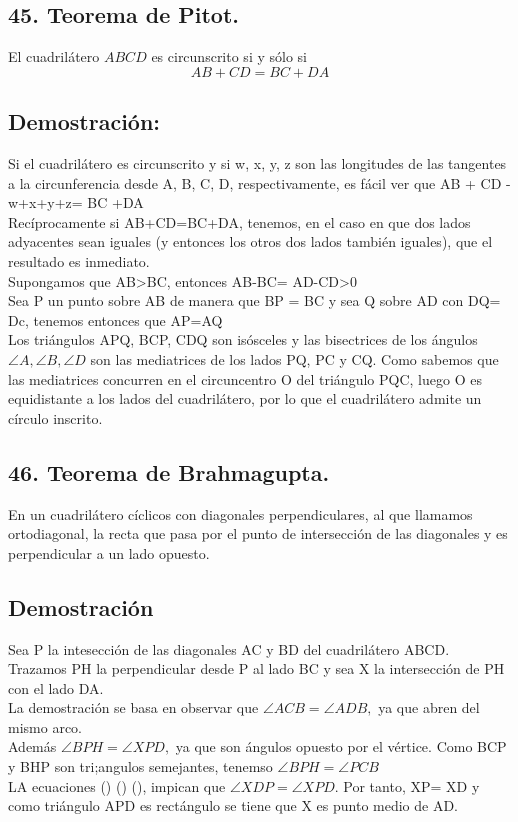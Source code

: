 \documentclass[12pt,a4paper]{article}
\begin{document}
\subsection*{45. Teorema de Pitot.}
El cuadrilátero $ABCD$ es circunscrito si y sólo si $$AB + CD = BC +DA$$
\subsection*{Demostración:}
Si el cuadrilátero es circunscrito y si w, x, y, z son las longitudes de las tangentes a la circunferencia desde A, B, C, D, respectivamente, es fácil ver que AB + CD - w+x+y+z= BC +DA
\\Recíprocamente  si AB+CD=BC+DA, tenemos, en el caso en que dos lados adyacentes sean iguales (y entonces los otros dos lados también iguales), que el resultado es inmediato.
\\Supongamos que AB>BC,  entonces AB-BC= AD-CD>0
\\Sea P un punto sobre AB de manera que BP = BC y sea Q sobre AD con DQ= Dc, tenemos entonces que AP=AQ
\\Los triángulos APQ, BCP, CDQ son isósceles y las bisectrices de los ángulos $\angle A, \angle B, \angle D$ son las mediatrices de los lados PQ, PC y CQ. Como sabemos que las mediatrices concurren en el circuncentro O del triángulo PQC, luego O es equidistante a los lados del cuadrilátero, por lo que el cuadrilátero admite un círculo inscrito.

\subsection*{46. Teorema de Brahmagupta.}
En un cuadrilátero cíclicos con diagonales perpendiculares, al que llamamos ortodiagonal, la recta que pasa por el punto de intersección de las diagonales y es perpendicular a un lado opuesto.
\subsection*{Demostración}
Sea P la intesección de las diagonales AC y BD del cuadrilátero ABCD. Trazamos PH la perpendicular desde P al lado BC y sea X la intersección de PH con el lado DA. \\La demostración se basa en observar que $\angle ACB = \angle ADB,$ ya que abren del mismo arco.
\\Además $\angle BPH =\angle XPD,$ ya que son ángulos opuesto por el vértice. Como BCP y BHP son tri;angulos semejantes, tenemso $\angle BPH = \angle PCB$
\\ LA ecuaciones () () (), impican que $\angle XDP = \angle XPD$. Por tanto, XP= XD y como triángulo APD es rectángulo se tiene que X es punto medio de AD.
\end{document}
